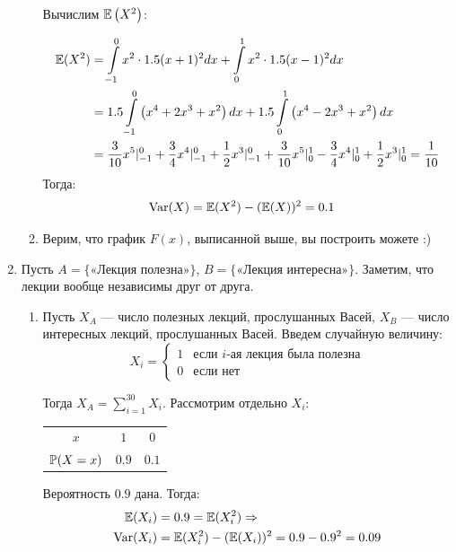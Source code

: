 \begin{enumerate}
\begin{enumerate}
Вычислим $\E\left(X^2\right)$:

\begin{align*}
\E(X^2) &= \int \limits_{-1}^0 x^2 \cdot 1.5 (x + 1)^2 dx +  \int \limits_0^1 x^2 \cdot 1.5 (x - 1)^2 dx \\
&= 1.5 \int \limits_{-1}^0\left( x^4 + 2x^3 + x^2\right) dx + 1.5 \int \limits_0^1\left( x^4 -2x^3 + x^2\right) dx \\
& =  \frac{3}{10} x^5 |_{-1}^0 + \frac{3}{4} x^4|_{-1}^0 + \frac{1}{2} x^3 |_{-1}^0 +  \frac{3}{10} x^5 |_0^1 - \frac{3}{4} x^4|_0^1  + \frac{1}{2} x^3 |_0^1 =  \frac{1}{10} \\
\end{align*}
Тогда:
\begin{align*}
&\Var(X) = \E(X^2) - (\E(X))^2 = 0.1
\end{align*}

\item Верим, что график $F(x)$, выписанной выше, вы построить можете :)
\end{enumerate}
\item
Пусть $A = \{\text{«Лекция полезна»}\}$, $B = \{\text{«Лекция интересна»}\}$. Заметим, что лекции вообще независимы друг от друга.

\begin{enumerate}
\item Пусть $X_A$ — число полезных лекций, прослушанных Васей,  $X_B$ — число интересных лекций, прослушанных Васей. Введем случайную величину:
\[X_i =
\begin{cases}
1 & \text{если } i\text{-ая лекция была полезна}\\
0 & \text{если нет}
\end{cases}
\]

Тогда $X_A = \sum\limits_{i=1}^{30}X_i$. Рассмотрим отдельно $X_i$:

\begin{center}
\begin{tabular}{@{}ccc@{}}
\toprule
$x$         & $1$             & $0$               \\
$\P(X=x)$ & $0.9$ & $0.1$ \\ \bottomrule
\end{tabular}
\end{center}

Вероятность $0.9$ дана. Тогда:
\begin{align*}
\E(X_i) &= 0.9 = \E(X^2_i) \Rightarrow \\
\Var(X_i) &= \E(X^2_i) - (\E(X_i))^2 = 0.9 - 0.9^2 = 0.09
\end{align*}


\end{enumerate}
\end{enumerate}
